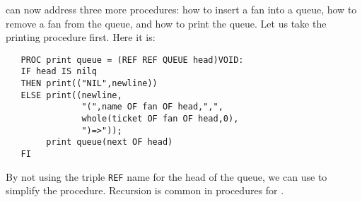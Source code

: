  can now address three more procedures: how
to insert a fan into a queue, how to remove a fan from the queue, and
how to print the queue. Let us take the printing procedure first. Here
it is:
\begin{verbatim}
   PROC print queue = (REF REF QUEUE head)VOID:
   IF head IS nilq
   THEN print(("NIL",newline))
   ELSE print((newline,
               "(",name OF fan OF head,",",
               whole(ticket OF fan OF head,0),
               ")=>"));
        print queue(next OF head)
   FI
\end{verbatim}
\noindent
By not using the triple \verb|REF| name for the head of the queue, we
can use  to simplify the procedure. Recursion is common
in procedures for .

